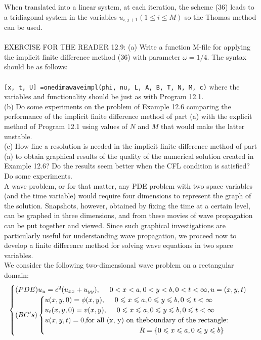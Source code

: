 \documentclass[../main.tex]{subfiles}
\begin{document}
{{\begin{figure}[H]
{{}}
	\label{pfig:ch12_17}
\end{figure}
When translated into a linear system, at each iteration, the scheme (36) leads to a tridiagonal system in the variables $u_{i,j+1} (1\leqslant i \leqslant M)$ so the Thomas method can be used. 
\\
\\
EXERCISE FOR THE READER 12.9: (a) Write a function M-file for applying the implicit finite difference method (36) with parameter $\omega = 1/4$. The syntax should be as follows: 
\\
\\
\texttt{[x, t, U] =onedimawaveimpl(phi, nu, L, A, B, T, N, M, c)}
where the variables and functionality should be just as with Program 12.1. 
\\
(b) Do some experiments on the problem of Example 12.6 comparing the performance of the implicit finite difference method of part (a) with the explicit method of Program 12.1 using values of $N$ and $M$ that would make the latter 
unstable.
\\
(c) How fine a resolution is needed in the implicit finite difference method of part (a) to obtain graphical results of the quality of the numerical solution created in Example 12.6? Do the results seem better when the CFL condition is satisfied? Do some experiments.
\\


A wave problem, or for that matter, any PDE problem with two space variables (and the time variable) would require four dimensions to represent the graph of the solution. Snapshots, however, obtained by fixing the time at a certain level, can be graphed in three dimensions, and from these movies of wave propagation can be put together and viewed. Since such graphical investigations are particularly useful for understanding wave propagation, we proceed now to develop a finite difference method for solving wave equations in two space variables.
\\

We consider the following two-dimensional wave problem on a rectangular 
domain:
\begin{equation}
	\begin{cases} 
	(PDE) u_u=c^2 (u_{xx}+u_{yy}),~~~~0<x<a, 0<y<b,0<t<\infty,u=(x,y,t)\\
(BC's)
		\begin{cases}
		u(x,y,0)=\phi(x,y), ~~~~ 0\leqslant x \leqslant a,0\leqslant y \leqslant b, 0 \leqslant t< \infty \\
		u_t(x,y,0)=v(x,y), ~~~~ 0\leqslant x \leqslant a,0\leqslant y \leqslant b, 0 \leqslant t< \infty \\
		 u(x, y, t) = 0, $for all (x, y) on theboundary of the rectangle:$\\
		 ~~~~~~~~~~~~~~~~~~~~~~~~~~~~~~~~~~~~~~~~ R= \lbrace 0\leqslant x\leqslant a, 0\leqslant y \leqslant b \rbrace
		\end{cases} 
	\end{cases}
\end{equation}


}}
\end{document}
